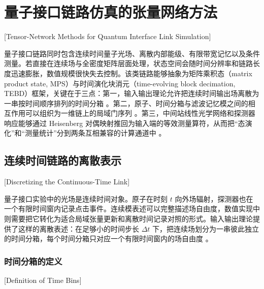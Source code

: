 ﻿%

\chapter{量子接口链路仿真的张量网络方法}[Tensor-Network Methods for Quantum Interface Link Simulation]

量子接口链路同时包含连续时间量子光场、离散内部能级、有限带宽记忆以及条件测量。若直接在连续场与全密度矩阵层面处理，状态空间会随时间分辨率和链路长度迅速膨胀，数值规模很快失去控制。该类链路能够抽象为矩阵乘积态（matrix product state, MPS）与时间演化块消元（time-evolving block decimation, TEBD）框架，关键在于三点：第一，输入输出理论允许把连续时间输出场离散为一串按时间顺序排列的时间分箱 \cite{GardinerCollett1985,Pichler2016TimeDelaysMPS}。第二，原子、时间分箱与滤波记忆模之间的相互作用可以组织为一维链上的局域门序列 \cite{Pichler2016TimeDelaysMPS,Guimond2017DelayedCoherentFeedbackMPS,ArranzRegidor2021WaveguideQED}。第三，中间站线性光学网络和探测器响应能够通过 Heisenberg 对偶映射推回为输入端的等效测量算符，从而把“态演化”和“测量统计”分到两条互相兼容的计算通道中 \cite{Kraus1983StatesEffectsOperations,NielsenChuang2010QCQI}。

\section{连续时间链路的离散表示}[Discretizing the Continuous-Time Link]

量子接口实验中的光场是连续时间对象。原子在时刻 $t$ 向外场辐射，探测器也在一个有限时间窗内记录点击事件。连续模表述可以完整描述场自由度，数值实现中则需要把它转化为适合局域张量更新和离散时间记录对照的形式。输入输出理论提供了这样的离散表述：在足够小的时间步长 $\Delta t$ 下，把连续场划分为一串彼此独立的时间分箱，每个时间分箱只对应一个有限时间窗内的场自由度 \cite{GardinerCollett1985,Pichler2016TimeDelaysMPS}。

\subsection{时间分箱的定义}[Definition of Time Bins]

